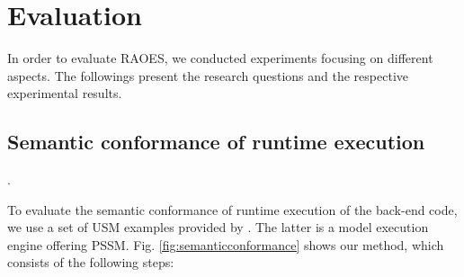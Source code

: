 \section{Evaluation}
\label{sec:exp}

In order to evaluate RAOES, we conducted experiments focusing on different aspects. 
The followings present the research questions and the respective experimental results. 






\subsection{Semantic conformance of runtime execution}
\label{subsec:exp1}
{} .

To evaluate the semantic conformance of runtime execution of the back-end code, we use a set of USM examples provided by  \cite{moka}. 
The latter is a model execution engine offering PSSM. 
Fig. \ref{fig:semanticconformance} shows our method, which consists of the following steps:

